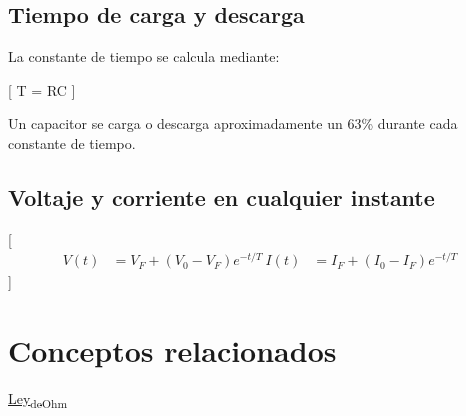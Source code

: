 \documentclass[11pt]{article}
\begin{document}
\subsection{Tiempo de carga y descarga}
\label{sec:orgea44460}

La constante de tiempo se calcula mediante:

[
T = RC
]

Un capacitor se carga o descarga aproximadamente un 63\% durante cada constante de tiempo.

\subsection{Voltaje y corriente en cualquier instante}
\label{sec:org6a1c679}

[
\begin{align}
V(t) &= V_F + (V_0 - V_F)e^{-t/T} \
I(t) &= I_F + (I_0 - I_F)e^{-t/T}
\end{align}
]

\section{Conceptos relacionados}
\label{sec:orgcfd69cc}

\href{Ley_de_Ohm.org}{Ley\textsubscript{de}\textsubscript{Ohm}}
\end{document}
